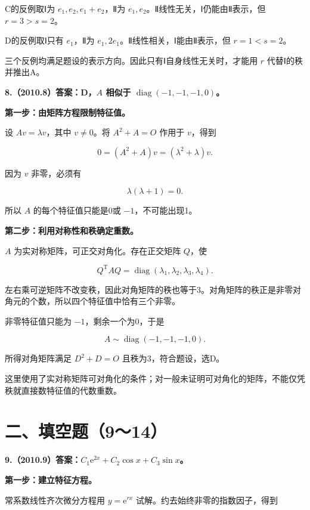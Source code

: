 \documentclass[UTF8,11pt,fontset=windows]{ctexart}
\begin{document}
C的反例取Ⅰ为 $e_1,e_2,e_1+e_2$，Ⅱ为 $e_1,e_2$。Ⅱ线性无关，Ⅰ仍能由Ⅱ表示，但 $r=3>s=2$。

D的反例取Ⅰ只有 $e_1$，Ⅱ为 $e_1,2e_1$。Ⅱ线性相关，Ⅰ能由Ⅱ表示，但 $r=1<s=2$。

三个反例均满足题设的表示方向。因此只有Ⅰ自身线性无关时，才能用 $r$ 代替Ⅰ的秩并推出A。

\clearpage

\textbf{8.（2010.8）答案：D，$A$ 相似于 $\operatorname{diag}(-1,-1,-1,0)$。}

\textbf{第一步：由矩阵方程限制特征值。}

设 $Av=\lambda v$，其中 $v\ne0$。将 $A^2+A=O$ 作用于 $v$，得到

$$
0=(A^2+A)v=(\lambda^2+\lambda)v.
$$

因为 $v$ 非零，必须有

$$
\lambda(\lambda+1)=0.
$$

所以 $A$ 的每个特征值只能是0或 $-1$，不可能出现1。

\textbf{第二步：利用对称性和秩确定重数。}

$A$ 为实对称矩阵，可正交对角化。存在正交矩阵 $Q$，使

$$
Q^{\mathrm T}AQ=\operatorname{diag}(\lambda_1,\lambda_2,\lambda_3,\lambda_4).
$$

左右乘可逆矩阵不改变秩，因此对角矩阵的秩也等于3。对角矩阵的秩正是非零对角元的个数，所以四个特征值中恰有三个非零。

非零特征值只能为 $-1$，剩余一个为0，于是

$$
\boxed{A\sim\operatorname{diag}(-1,-1,-1,0)}.
$$

所得对角矩阵满足 $D^2+D=O$ 且秩为3，符合题设，选D。

这里使用了实对称矩阵可对角化的条件；对一般未证明可对角化的矩阵，不能仅凭秩就直接数特征值的代数重数。

\clearpage

\section*{二、填空题（9～14）}

\textbf{9.（2010.9）答案：$C_1\mathrm e^{2x}+C_2\cos x+C_3\sin x$。}

\textbf{第一步：建立特征方程。}

常系数线性齐次微分方程用 $y=\mathrm e^{rx}$ 试解。约去始终非零的指数因子，得到
\end{document}
